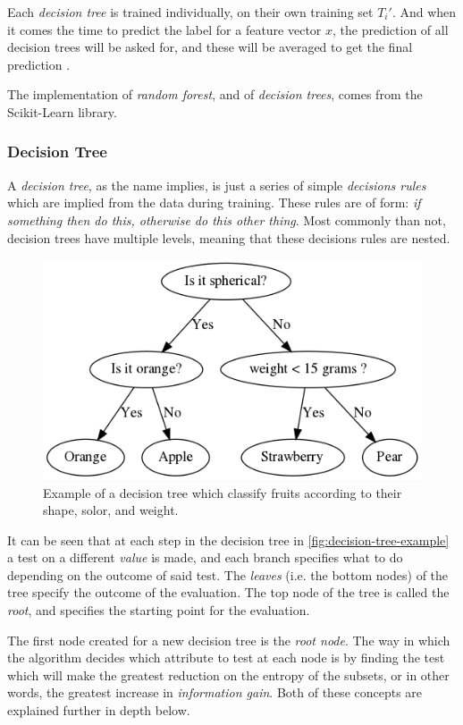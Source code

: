 \documentclass[epsfig,a4paper,11pt,titlepage,twoside,openany]{book}
\begin{document}
Each \textit{decision tree} is trained individually, on their own training set $T_i'$. And when it comes the time to predict the label for a feature vector $x$, the prediction of all decision trees will be asked for, and these will be averaged to get the final prediction \cite{scikit-learn}.

The implementation of \textit{random forest}, and of \textit{decision trees}, comes from the Scikit-Learn \cite{scikit-learn} library.


\subsubsection{Decision Tree}

A \textit{decision tree}, as the name implies, is just a series of simple \textit{decisions rules} which are implied from the data during training. These rules are of form: \textit{if something then do this, otherwise do this other thing}. Most commonly than not, decision trees have multiple levels, meaning that these decisions rules are nested. 

\begin{figure}[H]
  \centering \includegraphics[width=.5\textwidth]{decision_tree} 
  \caption{Example of a decision tree which classify fruits according to their shape, solor, and weight.}
  \label{fig:decision-tree-example}
\end{figure}

It can be seen that at each step in the decision tree in \autoref{fig:decision-tree-example} a test on a different \textit{value} is made, and each branch specifies what to do depending on the outcome of said test. The \textit{leaves} (i.e. the bottom nodes) of the tree specify the outcome of the evaluation. The top node of the tree is called the \textit{root}, and specifies the starting point for the evaluation. 

The first node created for a new decision tree is the \textit{root node}. The way in which the algorithm decides which attribute to test at each node is by finding the test which will make the greatest reduction on the entropy of the subsets, or in other words, the greatest increase in \textit{information gain}. Both of these concepts are explained further in depth below. 
\end{document}
